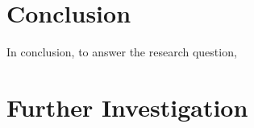 \section{Conclusion}
In conclusion, to answer the research question, 
\researchquestion{}

\section{Further Investigation} 